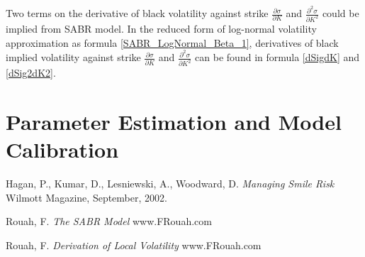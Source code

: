 \documentclass{article}
\begin{document}
Two terms on the derivative of black volatility against strike $ \frac{\partial \sigma}{\partial K} $ and $ \frac{\partial^2 \sigma}{\partial K^2} $ could be implied from SABR model.
In the reduced form of log-normal volatility approximation as formula \ref{SABR_LogNormal_Beta_1}, derivatives of black implied volatility against strike $ \frac{\partial \sigma}{\partial K} $ and $ \frac{\partial^2 \sigma}{\partial K^2} $ can be found in formula \ref{dSigdK} and \ref{dSig2dK2}.


\section{Parameter Estimation and Model Calibration}



\begin{thebibliography}{9}
    Hagan, P., Kumar, D., Lesniewski, A., Woodward, D.
    \textit{Managing Smile Risk}
    Wilmott Magazine, September, 2002.
    
    Rouah, F.
    \textit{The SABR Model}
    www.FRouah.com
    
    Rouah, F.
    \textit{Derivation of Local Volatility}
    www.FRouah.com
\end{thebibliography}
\end{document}

